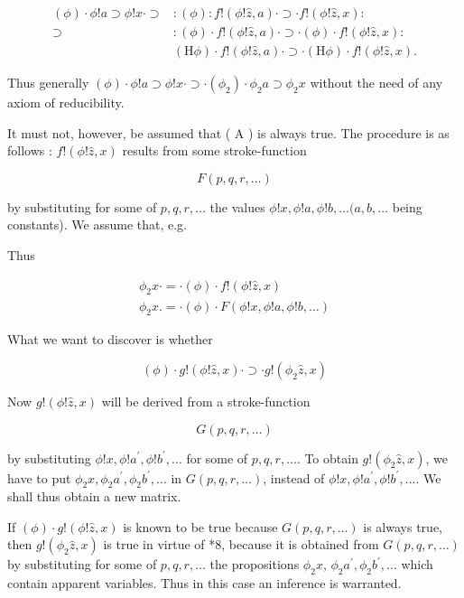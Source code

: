 \documentclass[10pt]{article}
\begin{document}
$$
\begin{aligned}
(\phi) \cdot \phi!a \supset \phi!x \cdot \supset & :(\phi): f!(\phi!\hat{z}, a) \cdot \supset \cdot f!(\phi!\hat{z}, x): \\
\supset & :(\phi) \cdot f!(\phi!\hat{z}, a) \cdot \supset \cdot(\phi) \cdot f!(\phi!\hat{z}, x): \\
& (\mathrm{H} \phi) \cdot f!(\phi!\hat{z}, a) \cdot \supset \cdot(\mathrm{H} \phi) \cdot f!(\phi!\hat{z}, x) .
\end{aligned}
$$

Thus generally $(\phi) \cdot \phi!a \supset \phi!x \cdot \supset \cdot\left(\phi_{2}\right) \cdot \phi_{2} a \supset \phi_{2} x$ without the need of any axiom of reducibility.

It must not, however, be assumed that ( A ) is always true. The procedure is as follows : $f!(\phi!\hat{z}, x)$ results from some stroke-function

$$
F(p, q, r, \ldots)
$$

by substituting for some of $p, q, r, \ldots$ the values $\phi!x, \phi!a, \phi!b, \ldots(a, b, \ldots$ being constants). We assume that, e.g.

Thus


\begin{gather*}
\phi_{2} x \cdot=\cdot(\phi) \cdot f!(\phi!\hat{z}, x) \\
\phi_{2} x .=\cdot(\phi) \cdot F(\phi!x, \phi!a, \phi!b, \ldots) \tag{B}
\end{gather*}


What we want to discover is whether

$$
(\phi) \cdot g!(\phi!\hat{z}, x) \cdot \supset \cdot g!\left(\phi_{2} \hat{z}, x\right)
$$

Now $g!(\phi!\hat{z}, x)$ will be derived from a stroke-function

$$
G(p, q, r, \ldots)
$$

by substituting $\phi!x, \phi!a^{\prime}, \phi!b^{\prime}, \ldots$ for some of $p, q, r, \ldots$. To obtain $g!\left(\phi_{2} \hat{z}, x\right)$, we have to put $\phi_{2} x, \phi_{2} a^{\prime}, \phi_{2} b^{\prime}, \ldots$ in $G(p, q, r, \ldots)$, instead of $\phi!x, \phi!a^{\prime}, \phi!b^{\prime}, \ldots$. We shall thus obtain a new matrix.

If $(\phi) \cdot g!(\phi!\hat{z}, x)$ is known to be true because $G(p, q, r, \ldots)$ is always true, then $g!\left(\phi_{2} \hat{z}, x\right)$ is true in virtue of *8, because it is obtained from $G(p, q, r, \ldots)$ by substituting for some of $p, q, r, \ldots$ the propositions $\phi_{2} x$, $\phi_{2} a^{\prime}, \phi_{2} b^{\prime}, \ldots$ which contain apparent variables. Thus in this case an inference is warranted.
\end{document}
